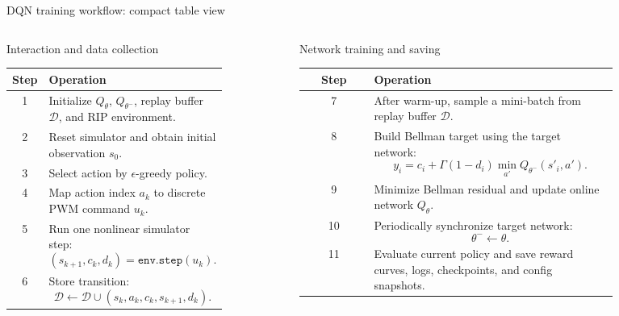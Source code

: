 \documentclass[aspectratio=169]{beamer}
\begin{document}
\begin{frame}{DQN training workflow: compact table view}

\scriptsize

\begin{columns}[T,totalwidth=\textwidth]

\begin{column}{0.49\textwidth}

\begin{block}{Interaction and data collection}
\begin{tabular}{c|p{0.78\linewidth}}
\hline
\textbf{Step} & \textbf{Operation} \\
\hline
1 & Initialize \(Q_\theta\), \(Q_{\theta^-}\), replay buffer \(\mathcal D\), and RIP environment. \\
\hline
2 & Reset simulator and obtain initial observation \(s_0\). \\
\hline
3 & Select action by \(\epsilon\)-greedy policy. \\
\hline
4 & Map action index \(a_k\) to discrete PWM command \(u_k\). \\
\hline
5 & Run one nonlinear simulator step:
\[
(s_{k+1},c_k,d_k)=\texttt{env.step}(u_k).
\]
\\
\hline
6 & Store transition:
\[
\mathcal D\leftarrow
\mathcal D\cup(s_k,a_k,c_k,s_{k+1},d_k).
\]
\\
\hline
\end{tabular}
\end{block}

\end{column}

\begin{column}{0.49\textwidth}

\begin{block}{Network training and saving}
\begin{tabular}{c|p{0.78\linewidth}}
\hline
\textbf{Step} & \textbf{Operation} \\
\hline
7 & After warm-up, sample a mini-batch from replay buffer \(\mathcal D\). \\
\hline
8 & Build Bellman target using the target network:
\[
y_i=c_i+\Gamma(1-d_i)\min_{a'}Q_{\theta^-}(s'_i,a').
\]
\\
\hline
9 & Minimize Bellman residual and update online network \(Q_\theta\). \\
\hline
10 & Periodically synchronize target network:
\[
\theta^-\leftarrow\theta.
\]
\\
\hline
11 & Evaluate current policy and save reward curves, logs, checkpoints, and config snapshots. \\
\hline
\end{tabular}
\end{block}


\end{column}
\end{columns}
\end{frame}
\end{document}
